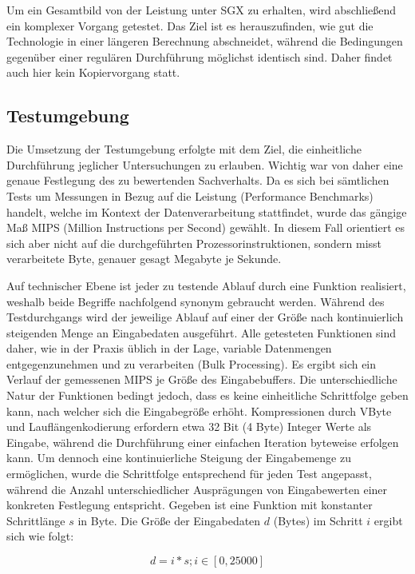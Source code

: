 Um ein Gesamtbild von der Leistung unter SGX zu erhalten, wird abschließend ein komplexer Vorgang getestet. Das Ziel ist es herauszufinden, wie gut die Technologie in einer längeren Berechnung abschneidet, während die Bedingungen gegenüber einer regulären Durchführung möglichst identisch sind. Daher findet auch hier kein Kopiervorgang statt.
\subsection{Testumgebung}
Die Umsetzung der Testumgebung erfolgte mit dem Ziel, die einheitliche Durchführung jeglicher Untersuchungen zu erlauben. Wichtig war von daher eine genaue Festlegung des zu bewertenden Sachverhalts. Da es sich bei sämtlichen Tests um Messungen in Bezug auf die Leistung (Performance Benchmarks) handelt, welche im Kontext der Datenverarbeitung stattfindet, wurde das gängige Maß MIPS (Million Instructions per Second) gewählt. In diesem Fall orientiert es sich aber nicht auf die durchgeführten Prozessorinstruktionen, sondern misst verarbeitete Byte, genauer gesagt Megabyte je Sekunde. 

Auf technischer Ebene ist jeder zu testende Ablauf durch eine Funktion realisiert, weshalb beide Begriffe nachfolgend synonym gebraucht werden. Während des Testdurchgangs wird der jeweilige Ablauf auf einer der Größe nach kontinuierlich steigenden Menge an Eingabedaten ausgeführt. Alle getesteten Funktionen sind daher, wie in der Praxis üblich in der Lage, variable Datenmengen entgegenzunehmen und zu verarbeiten (Bulk Processing). Es ergibt sich ein Verlauf der gemessenen MIPS je Größe des Eingabebuffers. Die unterschiedliche Natur der Funktionen bedingt jedoch, dass es keine einheitliche Schrittfolge geben kann, nach welcher sich die Eingabegröße erhöht. Kompressionen durch VByte und Lauflängenkodierung erfordern etwa 32 Bit (4 Byte) Integer Werte als Eingabe, während die Durchführung einer einfachen Iteration byteweise erfolgen kann. Um dennoch eine kontinuierliche Steigung der Eingabemenge zu ermöglichen, wurde die Schrittfolge entsprechend für jeden Test angepasst, während die Anzahl unterschiedlicher Ausprägungen von Eingabewerten einer konkreten Festlegung entspricht. Gegeben ist eine Funktion mit konstanter Schrittlänge $s$ in Byte. Die Größe der Eingabedaten $d$ (Bytes) im Schritt $i$ ergibt sich wie folgt: 

\begin{equation*}
	d = i * s; i \in [0, 25000]
\end{equation*}

